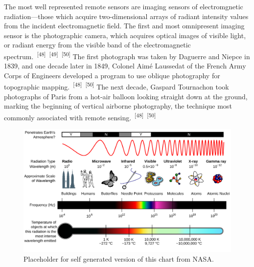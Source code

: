 \documentclass{article}
\begin{document}

\par{The most well represented remote sensors are imaging sensors of electromgnetic radiation---those which acquire two-dimensional arrays of radiant intensity values from the incident electromagnetic field. The first and most omnipresent imaging sensor is the photographic camera, which acquires optical images of visible light, or radiant energy from the visible band of the electromagnetic spectrum.~\textsuperscript{[48]}~\textsuperscript{[49]}~\textsuperscript{[50]} The first photograph was taken by Daguerre and Niepce in 1839, and one decade later in 1849, Colonel Aimé Laussedat of the French Army Corps of Engineers developed a program to use oblique photography for topographic mapping.~\textsuperscript{[48]}~\textsuperscript{[50]}  The next decade, Gaspard Tournachon took photographs of Paris from a hot-air balloon looking straight down at the ground, marking the beginning of vertical airborne photography, the technique most commonly associated with remote sensing.~\textsuperscript{[48]}~\textsuperscript{[50]}}


\begin{figure}
    \centering
    \includegraphics[width=1\linewidth]{images/em-spectrum.png}
    \caption{Placeholder for self generated version of this chart from NASA.}
    \label{figure12}
\end{figure}

\end{document}

